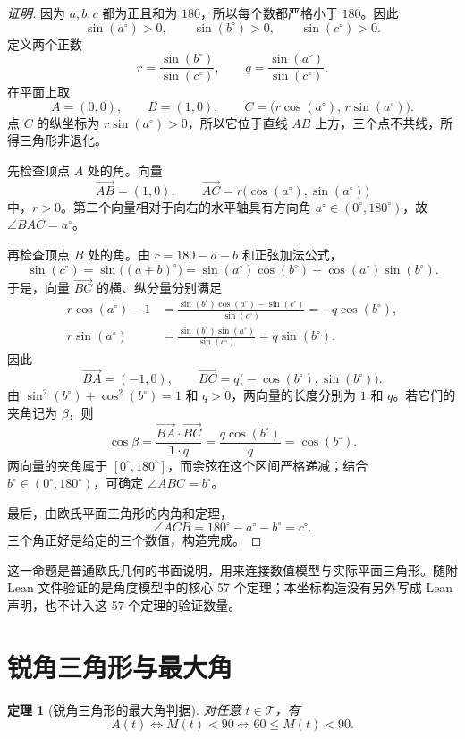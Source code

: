 \documentclass[UTF8,a4paper,zihao=-4,oneside,openany,fontset=fandol]{ctexbook}
\newtheorem{theorem}{定理}[chapter]
\theoremstyle{definition}
\theoremstyle{remark}
\begin{document}
\begin{proof}[证明]
因为 $a,b,c$ 都为正且和为 $180$，所以每个数都严格小于 $180$。因此
\[
\sin(a^\circ)>0,\qquad
\sin(b^\circ)>0,\qquad
\sin(c^\circ)>0.
\]
定义两个正数
\[
r=\frac{\sin(b^\circ)}{\sin(c^\circ)},
\qquad
q=\frac{\sin(a^\circ)}{\sin(c^\circ)}.
\]
在平面上取
\[
A=(0,0),\qquad B=(1,0),\qquad
C=\bigl(r\cos(a^\circ),\,r\sin(a^\circ)\bigr).
\]
点 $C$ 的纵坐标为 $r\sin(a^\circ)>0$，所以它位于直线 $AB$ 上方，三个点不共线，所得三角形非退化。

先检查顶点 $A$ 处的角。向量
\[
\overrightarrow{AB}=(1,0),\qquad
\overrightarrow{AC}=r\bigl(\cos(a^\circ),\sin(a^\circ)\bigr)
\]
中，$r>0$。第二个向量相对于向右的水平轴具有方向角 $a^\circ\in(0^\circ,180^\circ)$，故 $\angle BAC=a^\circ$。

再检查顶点 $B$ 处的角。由 $c=180-a-b$ 和正弦加法公式，
\[
\sin(c^\circ)
=\sin\bigl((a+b)^\circ\bigr)
=\sin(a^\circ)\cos(b^\circ)+\cos(a^\circ)\sin(b^\circ).
\]
于是，向量 $\overrightarrow{BC}$ 的横、纵分量分别满足
\[
\begin{aligned}
r\cos(a^\circ)-1
&=\frac{\sin(b^\circ)\cos(a^\circ)-\sin(c^\circ)}
        {\sin(c^\circ)}
=-q\cos(b^\circ),\\
r\sin(a^\circ)
&=\frac{\sin(b^\circ)\sin(a^\circ)}{\sin(c^\circ)}
=q\sin(b^\circ).
\end{aligned}
\]
因此
\[
\overrightarrow{BA}=(-1,0),\qquad
\overrightarrow{BC}
=q\bigl(-\cos(b^\circ),\sin(b^\circ)\bigr).
\]
由 $\sin^2(b^\circ)+\cos^2(b^\circ)=1$ 和 $q>0$，两向量的长度分别为 $1$ 和 $q$。若它们的夹角记为 $\beta$，则
\[
\cos\beta
=\frac{\overrightarrow{BA}\cdot\overrightarrow{BC}}{1\cdot q}
=\frac{q\cos(b^\circ)}q
=\cos(b^\circ).
\]
两向量的夹角属于 $[0^\circ,180^\circ]$，而余弦在这个区间严格递减；结合 $b^\circ\in(0^\circ,180^\circ)$，可确定 \mbox{$\angle ABC=b^\circ$}。

最后，由欧氏平面三角形的内角和定理，
\[
\angle ACB=180^\circ-a^\circ-b^\circ=c^\circ.
\]
三个角正好是给定的三个数值，构造完成。
\end{proof}

这一命题是普通欧氏几何的书面说明，用来连接数值模型与实际平面三角形。随附 Lean 文件验证的是角度模型中的核心 57 个定理；本坐标构造没有另外写成 Lean 声明，也不计入这 57 个定理的验证数量。


\section{锐角三角形与最大角}

\begin{theorem}[锐角三角形的最大角判据]
对任意 $t\in\mathcal T$，有
\[
A(t)\Longleftrightarrow M(t)<90
\Longleftrightarrow60\le M(t)<90.
\]
\end{theorem}
\end{document}
